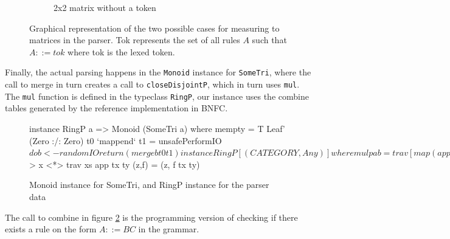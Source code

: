 \documentclass[a4paper,12pt,twosided]{report}
\begin{document}
\begin{figure}[H]
\begin{subfigure}[H]{.4\textwidth}
\caption{2x2 matrix without a token}
\end{subfigure}
\caption{\label{measurematrix} Graphical representation of the two possible
cases for measuring to matrices in the parser. Tok represents the set of all
rules $A$ such that $A ::= tok$ where tok is the lexed token.}
\end{figure}

Finally, the actual parsing happens in the \texttt{Monoid} instance for
\texttt{SomeTri}, where the call to merge in turn creates a call to
\texttt{closeDisjointP}, which in turn uses \texttt{mul}. The \texttt{mul}
function is defined in the typeclass \texttt{RingP}, our instance uses the
combine tables generated by the reference implementation in BNFC.

\begin{figure}[H]
\begin{code}
instance RingP a => Monoid (SomeTri a) where
    mempty = T Leaf' (Zero :/: Zero)
    t0 `mappend` t1 = unsafePerformIO $ do
      b <- randomIO
      return (merge b t0 t1)

instance RingP [(CATEGORY,Any)] where
  mul p a b = trav [map (app tx ty) l :/: map (app tx ty) r 
                   | (x,tx) <- a, (y,ty) <- b
                   , let l:/:r = combine p x y]
    where trav :: [Pair [a]] -> Pair [a]
          trav [] = pure []
          trav (x:xs) = (++) <$> x <*> trav xs
          app tx ty (z,f)  = (z, f tx ty)
\end{code}
\caption{\label{parsemonoid}Monoid instance for SomeTri, and RingP instance for
the parser data}
\end{figure}
The call to combine in figure \ref{parsemonoid} is the programming version of
checking if there exists a rule on the form $A ::= BC$ in the grammar.
\end{document}
